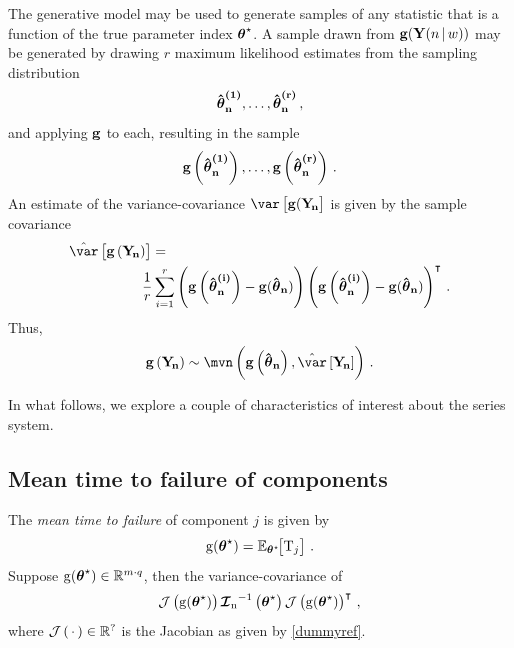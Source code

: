 \documentclass[
    11pt,
    extrafontsizes,
    article,
    oldfontcommands,
    final,
    oneside,
    openany,
    hidelinks]{memoir}
\begin{document}
The generative model may be used to generate samples of any statistic that is a function of the true parameter index ${\boldsymbol{\mathbf{\theta}}}^{\star}$. A sample drawn from $\boldsymbol{\mathbf{\operatorname{g}}}(\mathrm{\boldsymbol{\mathbf{Y}}}(n {\,|\,} w))$ may be generated by drawing $r$ maximum likelihood estimates from the sampling distribution
\begin{equation}
    \boldsymbol{\mathbf{\hat{\boldsymbol{\mathbf{\theta}}}_{n}^{(1)}}}, \ldots, \boldsymbol{\mathbf{\hat{\boldsymbol{\mathbf{\theta}}}_{n}^{(r)}}}\,,
\end{equation}
and applying $\boldsymbol{\mathbf{\operatorname{g}}}$ to each, resulting in the sample
\begin{equation}
\label{eq:phi_sample}
    \boldsymbol{\mathbf{\operatorname{g}}}\left(\boldsymbol{\mathbf{\hat{\boldsymbol{\mathbf{\theta}}}_{n}^{(1)}}}\right),
    \ldots,
    \boldsymbol{\mathbf{\operatorname{g}}}\left(\boldsymbol{\mathbf{\hat{\boldsymbol{\mathbf{\theta}}}_{n}^{(r)}}}\right)\,.
\end{equation}
An estimate of the variance-covariance $\var\left[\vecstat(\sampdu\right]$ is given by the sample covariance
\begin{equation}
\begin{split}
    \estimator{\var}\left[\vecstat\left(\sampdu\right)\right] &=\\
    & \!\!\!\! \frac{1}{r} \sum_{i=1}^{r}
            \left(\vecstat\left(\mleui{i}\right) - \vecstat(\mleu)\right)
            \left(\vecstat\left(\mleui{i}\right) - \vecstat(\mleu)\right)^\intercal\,.
\end{split}
\end{equation}
Thus,
\begin{equation}
    \vecstat\left(\sampdu\right) \sim \mvn\left(\vecstat\left(\mleu\right), \estimator{\var}\left[\sampdu\right] \right)\,.
\end{equation}

In what follows, we explore a couple of characteristics of interest about the series system.
\subsection{Mean time to failure of components}
The \emph{mean time to failure} of component $j$ is given by
\begin{equation}
    \operatorname{g}({\boldsymbol{\mathbf{\theta}}}^{\star}) = \operatorname{\mathbb{E}}_{{\boldsymbol{\mathbf{\theta}}}^{\star}}\!\! \left[\mathrm{T}_j\right]\,.
\end{equation}
Suppose $\operatorname{g}({\boldsymbol{\mathbf{\theta}}}^{\star}) \in \mathbb{R}^{m \cdot q}$, then the variance-covariance of 
\begin{equation}
    \operatorname{\mathcal{J}}\left(\operatorname{g}({\boldsymbol{\mathbf{\theta}}}^{\star})\right) \operatorname{\boldsymbol{\mathcal{I}_n}}^{-1}\left({\boldsymbol{\mathbf{\theta}}}^{\star}\right) \operatorname{\mathcal{J}}\left(\operatorname{g}({\boldsymbol{\mathbf{\theta}}}^{\star})\right)^\intercal\,,
\end{equation}
where $\operatorname{\mathcal{J}}\left(\,\cdot\,\right) \in \mathbb{R}^{?}$ is the Jacobian as 
given by \cref{dummyref}.
\end{document}

